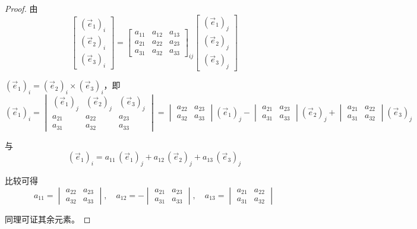 \begin{proof}
由
\begin{equation*}
\begin{bmatrix} (\vec{e}_1)_i \\ (\vec{e}_2)_i \\ (\vec{e}_3)_i \end{bmatrix} = \begin{bmatrix} a_{11} & a_{12} & a_{13} \\ a_{21} & a_{22} & a_{23} \\ a_{31} & a_{32} & a_{33} \end{bmatrix}_{\!ij} \begin{bmatrix} (\vec{e}_1)_j \\ (\vec{e}_2)_j \\ (\vec{e}_3)_j \end{bmatrix}
\end{equation*}

$(\vec{e}_1)_i = (\vec{e}_2)_i \times (\vec{e}_3)_i$，即
\begin{equation*}
(\vec{e}_1)_i = \begin{vmatrix} (\vec{e}_1)_j & (\vec{e}_2)_j & (\vec{e}_3)_j \\ a_{21} & a_{22} & a_{23} \\ a_{31} & a_{32} & a_{33} \end{vmatrix} = \begin{vmatrix} a_{22} & a_{23} \\ a_{32} & a_{33} \end{vmatrix} (\vec{e}_1)_j - \begin{vmatrix} a_{21} & a_{23} \\ a_{31} & a_{33} \end{vmatrix} (\vec{e}_2)_j + \begin{vmatrix} a_{21} & a_{22} \\ a_{31} & a_{32} \end{vmatrix} (\vec{e}_3)_j
\end{equation*}

与
\begin{equation*}
(\vec{e}_1)_i = a_{11}\, (\vec{e}_1)_j + a_{12}\, (\vec{e}_2)_j + a_{13}\, (\vec{e}_3)_j
\end{equation*}

比较可得
\begin{equation*}
a_{11} = \begin{vmatrix} a_{22} & a_{23} \\ a_{32} & a_{33} \end{vmatrix}, \quad a_{12} = -\begin{vmatrix} a_{21} & a_{23} \\ a_{31} & a_{33} \end{vmatrix}, \quad a_{13} = \begin{vmatrix} a_{21} & a_{22} \\ a_{31} & a_{32} \end{vmatrix}
\end{equation*}

同理可证其余元素。
\end{proof}

